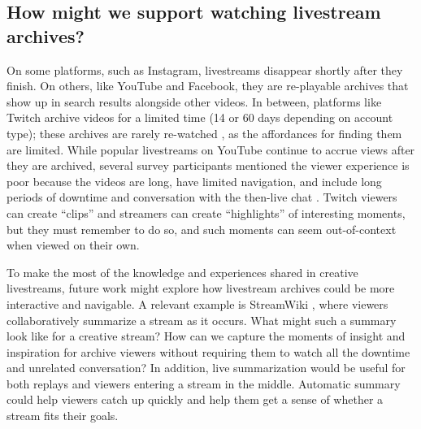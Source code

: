 \subsection{How might we support watching livestream archives?}


On some platforms, such as Instagram, livestreams disappear shortly after they finish. On others, like YouTube and Facebook, they are re-playable archives that show up in search results alongside other videos. In between, platforms like Twitch archive videos for a limited time (14 or 60 days depending on account type); these archives are rarely re-watched  \cite{Jia2016}, as the affordances for finding them are limited.
While popular livestreams on YouTube continue to accrue views after they are archived, several survey participants mentioned the viewer experience is poor because the videos are long, have limited navigation, and include long periods of downtime and conversation with the then-live chat \cite{Lu2018}. Twitch viewers can create ``clips'' and streamers can create ``highlights'' of interesting moments, but they must remember to do so, and such moments can seem out-of-context when viewed on their own.

To make the most of the knowledge and experiences shared in creative livestreams, future work might explore how livestream archives could be more interactive and navigable. A relevant example is StreamWiki \cite{Lu2018}, where viewers collaboratively summarize a stream as it occurs. What might such a summary look like for a creative stream? How can we capture the moments of insight and inspiration for archive viewers without requiring them to watch all the downtime and unrelated conversation?
In addition, live summarization would be useful for both replays and viewers entering a stream in the middle. Automatic summary could help viewers catch up quickly and help them get a sense of whether a stream fits their goals.

